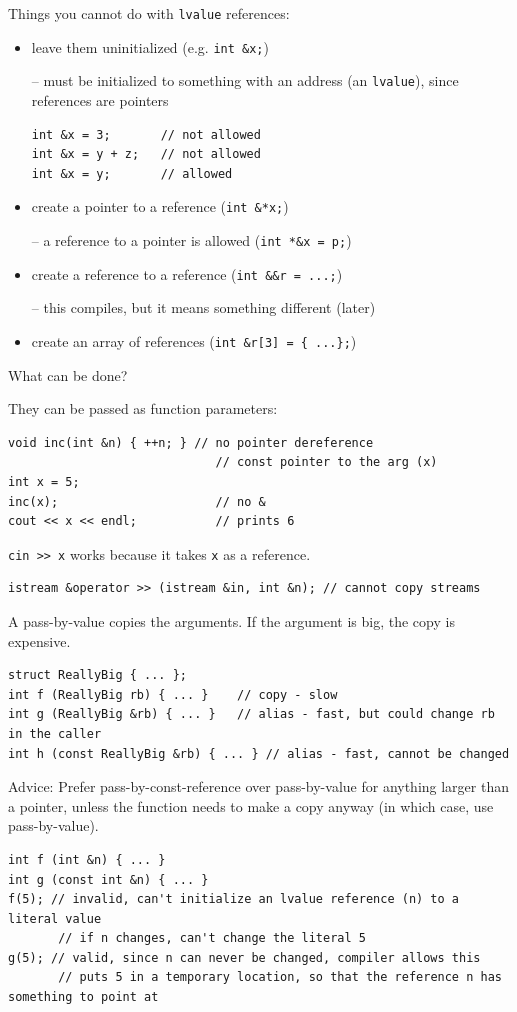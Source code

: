 \documentclass[11pt]{article}
\theoremstyle{definition}
\begin{document}
Things you cannot do with {\tt lvalue} references: \vspace{-0.25cm}
\begin{itemize}

\item leave them uninitialized (e.g. {\tt int \&x;})
    
-- must be initialized to something with an address (an {\tt lvalue}), since references are pointers
\begin{lstlisting}
int &x = 3;       // not allowed
int &x = y + z;   // not allowed
int &x = y;       // allowed
\end{lstlisting}

\item create a pointer to a reference ({\tt int \&*x;})

-- a reference to a pointer is allowed ({\tt int *\&x = p;})

\item create a reference to a reference ({\tt int \&\&r = ...;})

-- this compiles, but it means something different (later)

\item create an array of references ({\tt int \&r[3] = \{ ...\hspace{5pt}\};})
\end{itemize}
\vspace{-0.25cm}
What can be done? 

They can be passed as function parameters:
\begin{lstlisting}
void inc(int &n) { ++n; } // no pointer dereference
                             // const pointer to the arg (x)
int x = 5;
inc(x);                      // no &
cout << x << endl;           // prints 6
\end{lstlisting}

{\tt cin >\null> x} works because it takes {\tt x} as a reference.
\begin{lstlisting}
istream &operator >> (istream &in, int &n); // cannot copy streams
\end{lstlisting}
A pass-by-value copies the arguments. If the argument is big, the copy is expensive. 
\begin{lstlisting}
struct ReallyBig { ... };
int f (ReallyBig rb) { ... }    // copy - slow
int g (ReallyBig &rb) { ... }   // alias - fast, but could change rb in the caller
int h (const ReallyBig &rb) { ... } // alias - fast, cannot be changed
\end{lstlisting}
Advice: Prefer pass-by-const-reference over pass-by-value for anything larger than a pointer, unless the function needs to make a copy anyway (in which case, use pass-by-value).
\begin{lstlisting}
int f (int &n) { ... }
int g (const int &n) { ... } 
f(5); // invalid, can't initialize an lvalue reference (n) to a literal value
       // if n changes, can't change the literal 5
g(5); // valid, since n can never be changed, compiler allows this
       // puts 5 in a temporary location, so that the reference n has something to point at
\end{lstlisting}
\end{document}
